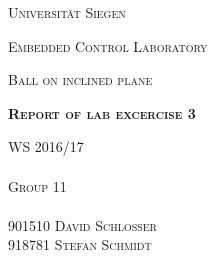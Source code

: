 \documentclass[12pt,a4paper]{article}
\begin{document}
\begin{titlepage}
	\begin{center}
	{\scshape\LARGE Universität Siegen \par}
	\vspace{3cm}
	{\scshape\LARGE Embedded Control Laboratory \par}
	\vspace{1cm}
	{\scshape\Large Ball on inclined plane \par}
	\vspace{5cm}
	{\scshape\Large\bfseries Report of lab excercise 3 \par}
	\vfill
	\end{center}
	{\scshape WS 2016/17\\ \\ Group 11\\ \\ 901510 David Schlosser\\ 918781 Stefan Schmidt \par}	
\end{titlepage}
\pagestyle{fancy}
\onehalfspacing
\tableofcontents
\newpage


\end{document}
